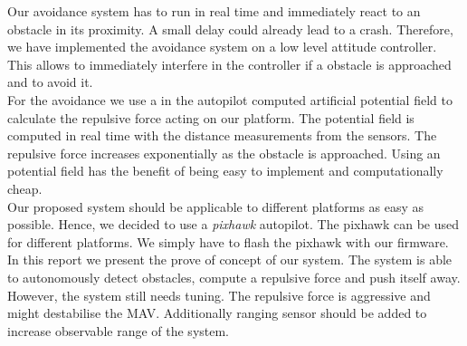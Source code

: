 Our avoidance system has to run in real time and immediately react to an obstacle in its proximity. A small delay could already lead to a crash. Therefore, we have implemented the avoidance system on a low level attitude controller. This allows to immediately interfere in the controller if a obstacle is approached and to avoid it.\\
For the avoidance we use a in the autopilot computed artificial potential field to calculate the repulsive force acting on our platform. The potential field is computed in real time with the distance measurements from the sensors. The repulsive force increases exponentially as the obstacle is approached. Using an potential field has the benefit of being easy to implement and computationally cheap.\\
Our proposed system should be applicable to different platforms as easy as possible. Hence, we decided to use a \textit{pixhawk} autopilot. The pixhawk can be used for different platforms. We simply have to flash the pixhawk with our firmware.\\
In this report we present the prove of concept of our system. The system is able to autonomously detect obstacles, compute a repulsive force and push itself away. However, the system still needs tuning. The repulsive force is aggressive and might destabilise the MAV. Additionally ranging sensor should be added to increase observable range of the system.
